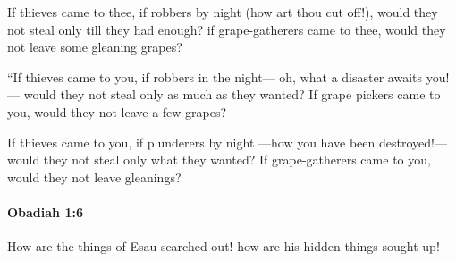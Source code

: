 			\begin{versebox}
					\item[BHS] 
					\item[LXX] 
					\item[ASV] If thieves came to thee, if robbers by night (how art thou cut off!), would they not steal only till they had enough? if grape-gatherers came to thee, would they not leave some gleaning grapes?
					\item[NIV] “If thieves came to you, if robbers in the night— oh, what a disaster awaits you!— would they not steal only as much as they wanted? If grape pickers came to you, would they not leave a few grapes?
					\item[NRSV] If thieves came to you, if plunderers by night —how you have been destroyed!— would they not steal only what they wanted? If grape-gatherers came to you, would they not leave gleanings?
			\end{versebox}

		\paragraph{Obadiah 1:6} %
			\label{OBADIAH-1-6}

			How are the things of Esau searched out! how are his hidden things sought up!

